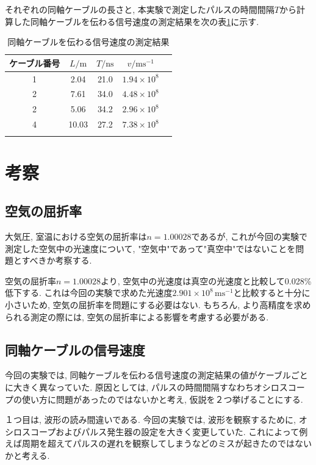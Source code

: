 \documentclass{jarticle}
\begin{document}
それぞれの同軸ケーブルの長さと, 本実験で測定したパルスの時間間隔$T$から計算した同軸ケーブルを伝わる信号速度の測定結果を次の表\ref{tb:cable-result}に示す.

\begin{table}[h]
  \centering
  \caption{同軸ケーブルを伝わる信号速度の測定結果}
  \begin{tabular}{ccccc}
    \hline
    ケーブル番号 & $L/\mathrm{m}$ & $T/\mathrm{ns}$ & $v/\mathrm{ms^{-1}}$ \\
    \hline
    1 & 2.04 & 21.0 & $1.94\times10^8$ \\
    2 & 7.61 & 34.0 & $4.48\times10^8$ \\
    2 & 5.06 & 34.2 & $2.96\times10^8$ \\
    4 & 10.03 & 27.2 & $7.38\times10^8$ \\
    \hline
    \label{tb:cable-result}
  \end{tabular}
\end{table}



\section{考察}


\subsection{空気の屈折率}

大気圧, 室温における空気の屈折率は$n=1.00028$であるが, これが今回の実験で測定した空気中の光速度について, "空気中"であって"真空中"ではないことを問題とすべきか考察する.

空気の屈折率$n=1.00028$より, 空気中の光速度は真空の光速度と比較して0.028\%低下する.
これは今回の実験で求めた光速度$2.901\times10^8\,\mathrm{ms^{-1}}$と比較すると十分に小さいため, 空気の屈折率を問題にする必要はない. もちろん, より高精度を求められる測定の際には, 空気の屈折率による影響を考慮する必要がある.


\subsection{同軸ケーブルの信号速度}

今回の実験では, 同軸ケーブルを伝わる信号速度の測定結果の値がケーブルごとに大きく異なっていた.
原因としては, パルスの時間間隔すなわちオシロスコープの使い方に問題があったのではないかと考え, 仮説を２つ挙げることにする.

１つ目は, 波形の読み間違いである.
今回の実験では, 波形を観察するために, オシロスコープおよびパルス発生器の設定を大きく変更していた.
これによって例えば周期を超えてパルスの遅れを観察してしまうなどのミスが起きたのではないかと考える.
\end{document}
